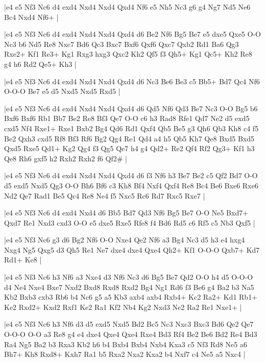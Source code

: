 \whitename{}
\blackname{}
\makegametitle
|e4 e5 Nf3 Nc6 d4 exd4 Nxd4 Nxd4 Qxd4 Nf6 e5 Nh5 Nc3 g6 g4 Ng7 Nd5 Ne6 Bc4 Nxd4 Nf6+  |

\whitename{}
\blackname{}
\makegametitle
|e4 e5 Nf3 Nc6 d4 exd4 Nxd4 Nxd4 Qxd4 d6 Be2 Nf6 Bg5 Be7 e5 dxe5 Qxe5 O-O Nc3 b6 Nd5 Re8 Nxc7 Bd6 Qc3 Bxc7 Bxf6 Qxf6 Qxc7 Qxb2 Rd1 Ba6 Qg3 Rxe2+ Kf1 Re3+ Kg1 Rxg3 hxg3 Qxc2 Kh2 Qf5 f3 Qh5+ Kg1 Qc5+ Kh2 Re8 g4 h6 Rd2 Qe5+ Kh3  |

\whitename{}
\blackname{}
\makegametitle
|e4 e5 Nf3 Nc6 d4 exd4 Nxd4 Nxd4 Qxd4 d6 Nc3 Be6 Be3 c5 Bb5+ Bd7 Qc4 Nf6 O-O-O Be7 e5 d5 Nxd5 Nxd5 Rxd5  |

\whitename{}
\blackname{}
\makegametitle
|e4 e5 Nf3 Nc6 d4 exd4 Nxd4 Nxd4 Qxd4 d6 Qd5 Nf6 Qd3 Be7 Nc3 O-O Bg5 b6 Bxf6 Bxf6 Rb1 Bb7 Be2 Re8 Bf3 Qe7 O-O c6 h3 Rad8 Rfe1 Qd7 Ne2 d5 exd5 cxd5 Nf4 Rxe1+ Rxe1 Bxb2 Bg4 Qd6 Rd1 Qxf4 Qb5 Be5 g3 Qh6 Qb3 Kh8 c4 f5 Be2 Qxh3 cxd5 Rf8 Bf3 Rf6 Bg2 Qg4 Re1 Qd4 a4 h5 Qb5 Kh7 Qe8 Bxd5 Bxd5 Qxd5 Rxe5 Qd1+ Kg2 Qg4 f3 Qg5 Qe7 h4 g4 Qd2+ Re2 Qf4 Rf2 Qg3+ Kf1 h3 Qe8 Rh6 gxf5 h2 Rxh2 Rxh2 f6 Qf2\#  |

\whitename{}
\blackname{}
\makegametitle
|e4 e5 Nf3 Nc6 d4 exd4 Nxd4 Nxd4 Qxd4 d6 f3 Nf6 h3 Be7 Be2 c5 Qf2 Bd7 O-O d5 exd5 Nxd5 Qg3 O-O Bh6 Bf6 c3 Kh8 Bf4 Nxf4 Qxf4 Re8 Bc4 Be6 Bxe6 Rxe6 Nd2 Qe7 Rad1 Be5 Qc4 Re8 Ne4 f5 Nxc5 Rc6 Rd7 Rxc5 Rxe7  |

\whitename{}
\blackname{}
\makegametitle
|e4 e5 Nf3 Nc6 d4 exd4 Nxd4 d6 Bb5 Bd7 Qd3 Nf6 Bg5 Be7 O-O Ne5 Bxd7+ Qxd7 Re1 Nxd3 cxd3 O-O e5 dxe5 Rxe5 Rfe8 f4 Bd6 Rd5 c6 Rf5 c5 Nb3 Qxf5  |

\whitename{}
\blackname{}
\makegametitle
|e4 e5 Nf3 Nc6 g3 d6 Bg2 Nf6 O-O Nxe4 Qe2 Nf6 a3 Bg4 Nc3 d5 h3 e4 hxg4 Nxg4 Ng5 Qxg5 d3 Qh5 Re1 Ne7 dxe4 dxe4 Qxe4 Qh2+ Kf1 O-O-O Qxb7+ Kd7 Rd1+ Ke8  |

\whitename{}
\blackname{}
\makegametitle
|e4 e5 Nf3 Nc6 h3 Nf6 a3 Nxe4 d3 Nf6 Nc3 d6 Bg5 Be7 Qd2 O-O h4 d5 O-O-O d4 Ne4 Nxe4 Bxe7 Nxd2 Bxd8 Rxd8 Rxd2 Bg4 Ng1 Rd6 f3 Be6 g4 Ba2 b3 Na5 Kb2 Bxb3 cxb3 Rb6 b4 Nc6 g5 a5 Kb3 axb4 axb4 Rxb4+ Kc2 Ra2+ Kd1 Rb1+ Ke2 Rxd2+ Kxd2 Rxf1 Ke2 Ra1 Kf2 Nb4 Kg2 Nxd3 Ne2 Ra2 Re1 Nxe1+  |

\whitename{}
\blackname{}
\makegametitle
|e4 e5 Nf3 Nc6 h3 Nf6 d3 d5 exd5 Nxd5 Bd2 Bc5 Nc3 Nxc3 Bxc3 Bd6 Qe2 Qe7 O-O-O O-O a3 Re8 g4 e4 dxe4 Qxe4 Qxe4 Rxe4 Bd3 Rf4 Be2 Be6 Bd2 Re4 Bd3 Ra4 Ng5 Ba2 b3 Rxa3 Kb2 h6 b4 Bxb4 Bxb4 Nxb4 Kxa3 c5 Nf3 Rd8 Ne5 a6 Bh7+ Kh8 Rxd8+ Kxh7 Ra1 b5 Rxa2 Nxa2 Kxa2 b4 Nxf7 c4 Ne5 a5 Nxc4  |

